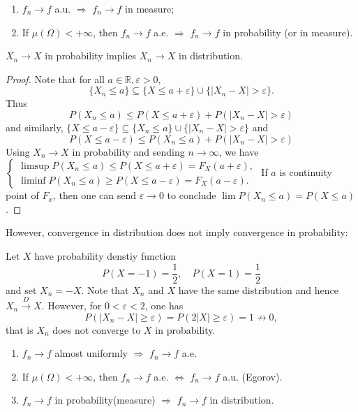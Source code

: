 \documentclass[11pt,singlecolumn, openany, citestyle=authoryear]{elegantbook}
\begin{document}
\begin{CJK}{UTF8}{gbsn}
\begin{corollary}
    \begin{enumerate}
        \item $f_n \to f$ a.u. $\Longrightarrow$ $f_n \to f$ in measure;
        \item If $\mu(\Omega)<+\infty$, then $f_n\to f$ a.e. $\Longrightarrow$ 
        $f_n\to f$ in probability (or in measure).
    \end{enumerate}
\end{corollary}
\begin{theorem}
    $X_n \to X$ in probability implies $X_n \to X$ in distribution. 
\end{theorem}
\begin{proof}
    Note that for all $a\in\mathbb{R},\varepsilon>0$,
    $$
    \{X_n\leqslant a\}\subseteq \{X\leqslant a+\varepsilon\} \cup \{|X_n-X|>\varepsilon\}.
    $$ 
    Thus 
    $$
    P(X_n\leqslant a)\leqslant P(X\leqslant a+\varepsilon)+P(|X_n-X|>\varepsilon)
    $$
    and 
    similarly, $\{X\leqslant a-\varepsilon\}\subseteq \{X_n \leqslant a\}\cup 
    \{|X_n-X|>\varepsilon\}$ and 
    $$
    P(X\leqslant a- \varepsilon)\leqslant P(X_n\leqslant a)+P(|X_n-X|>\varepsilon)
    $$
   Using $X_n \to X$ in probability and sending $n\to\infty$, we have 
   $
   \begin{cases}
    \limsup P(X_n\leqslant a)\leqslant P(X\leqslant a+\varepsilon)=F_X(a+\varepsilon),\\
    \liminf P(X_n\leqslant a)\geqslant P(X\leqslant a-\varepsilon)=F_X(a-\varepsilon).
   \end{cases}
   $
   If $a$ is continuity point of $F_x$, then one can send $\varepsilon \to 0$ to conclude 
   $\lim P(X_n\leqslant a) = P(X\leqslant a)$.
\end{proof}
However, convergence in distribution does not imply convergence in probability:
\begin{example}
    Let $X$ have probability denstiy function
    $$
    P(X=-1)=\frac{1}{2},\quad P(X=1)=\frac{1}{2}
    $$
    and set $X_n=-X$. Note that $X_n$ and $X$ have the same distribution and hence 
    $X_n \overset{D}{\longrightarrow} X$. However, for $0<\varepsilon<2$, one has 
    $$
    P(|X_n-X|\geqslant \varepsilon)=P(2|X|\geqslant \varepsilon)=1 \nrightarrow 0,
    $$
    that is $X_n$ does not converge to $X$ in probability.
\end{example}
\begin{conclusion}
    \begin{enumerate}
        \item $f_n\to f$ almost uniformly $\Longrightarrow$ $f_n\to f$ a.e.
        \item If $\mu(\Omega)<+\infty$, then $f_n\to f$ a.e. $\iff$ $f_n \to f$ 
        a.u. (Egorov).
        \item $f_n \to f$ in probability(measure) $\Longrightarrow$ $f_n \to f$ in  
        distribution.
    \end{enumerate}
\end{conclusion}


\end{CJK}
\end{document}
